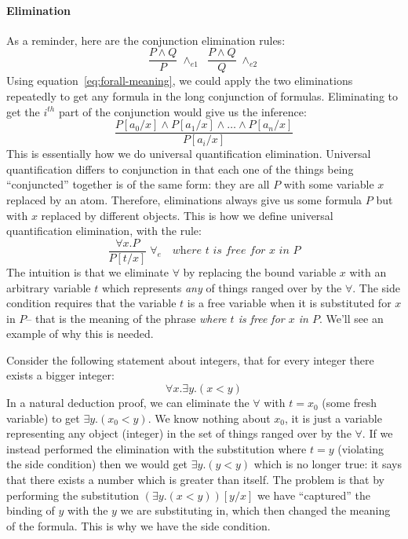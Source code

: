 \documentclass{article}
\theoremstyle{definition}
\begin{document}
\paragraph{Elimination} As a reminder, here
are the conjunction elimination rules:
%
\begin{equation*}
\dfrac{P \wedge Q}
        {P} \; {\wedge_{e1}}
\;\;
\dfrac{P \wedge Q}
  {Q} \; {\wedge_{e2}}
\end{equation*}
%
Using equation~\eqref{eq:forall-meaning}, we could apply the two
eliminations repeatedly to get any formula in the long conjunction of
formulas. Eliminating to get the $i^{th}$ part of the conjunction
would give us the inference:
%
\begin{equation*}
  \dfrac{P[a_0/x] \wedge P[a_1/x] \wedge \ldots \wedge P[a_{n}/x]}
  {P[a_i/x]}
\end{equation*}
%
This is essentially how we do universal quantification elimination.
Universal quantification differs to conjunction in that each one of the things
being ``conjuncted'' together is of the same form: they are all $P$
with some variable $x$ replaced by an atom. Therefore, eliminations
always give us some formula $P$ but with $x$ replaced by different objects. This is how
we define universal quantification elimination, with the rule:
%
\begin{equation*}
  \dfrac{\forall x . P}
  {P [t/x]} \; {\forall_e} \quad \textit{where $t$ is free for $x$ in $P$}
\end{equation*}
%
The intuition is that we eliminate $\forall$ by replacing the bound
variable $x$ with an arbitrary variable $t$ which represents
\emph{any} of things ranged over by the $\forall$.
The side condition requires that the variable $t$ is a free variable
 when it is substituted for $x$ in $P$-- that is the meaning of the
 phrase \emph{where $t$ is free for $x$ in $P$}. We'll see an example of
why this is needed.

Consider the following statement about integers, that for
every integer there exists a bigger integer:
%
\begin{equation*}
  \forall x . \exists y . (x < y)
\end{equation*}
In a natural deduction proof, we can eliminate the $\forall$ with
$t = x_0$ (some fresh variable) to get $\exists y . (x_0 < y)$. We
know nothing about $x_0$, it is just a variable representing any
object (integer) in the set of things ranged over by the $\forall$.
If we instead performed the elimination with the substitution where
$t = y$ (violating the side condition) then we would get
$\exists y . (y < y)$ which is no longer true: it says that there
exists a number which is greater than itself. The problem is that by
performing the substitution $(\exists y. (x < y))[y/x]$ we have
``captured'' the binding of $y$ with the $y$ we are substituting in,
which then changed the meaning of the formula. This is why we have the
side condition.
\end{document}
